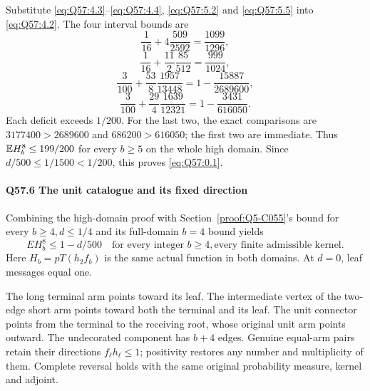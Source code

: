 Substitute \eqref{eq:Q57:4.3}--\eqref{eq:Q57:4.4},
\eqref{eq:Q57:5.2} and \eqref{eq:Q57:5.5} into
\eqref{eq:Q57:4.2}. The four interval bounds are
\[
\frac1{16}+4\frac{509}{2592}=\frac{1099}{1296},
\]
\[
\frac1{16}+\frac{11}{2}\frac{85}{512}=\frac{999}{1024},
\]
\[
\frac3{100}+\frac{53}{8}\frac{1957}{13448}
=1-\frac{15887}{2689600},
\]
\[
\frac3{100}+\frac{29}{4}\frac{1639}{12321}
=1-\frac{3431}{616050}.
\tag{Q57.5.6}\label{eq:Q57:5.6}
\]
Each deficit exceeds \(1/200\). For the last two, the exact comparisons are
\(3177400>\allowbreak 2689600\) and \(686200>\allowbreak 616050\); the first two are immediate.
Thus \(\mathbb E H_b^8\le\allowbreak 199/200\) for every \(b\ge\allowbreak 5\) on the whole high domain.
Since \(d/500\le\allowbreak 1/1500<\allowbreak 1/200\), this proves \eqref{eq:Q57:0.1}.

\paragraph{Q57.6 The unit catalogue and its fixed direction}
Combining the high-domain proof with Section~\ref{proof:Q5-C055}'s bound for every \(b\ge\allowbreak 4,\allowbreak d\le\allowbreak 1/4\) and its full-domain \(b=\allowbreak 4\) bound yields
\[
\boxed{EH_b^8\le1-d/500
\quad\text{for every integer }b\ge4,\text{every finite admissible kernel}.} \tag{Q57.6.1}\label{eq:Q57:6.1}
\]
Here \(H_b=\allowbreak pT(h_2f_b)\) is the same actual function in both domains.
At \(d=\allowbreak 0\), leaf messages equal one.

The long terminal arm points toward its leaf.
The intermediate vertex of the two-edge short arm points toward both the terminal and its leaf.
The unit connector points from the terminal to the receiving root, whose original unit arm points outward.
The undecorated component has \(b+4\) edges.
Genuine equal-arm pairs retain their directions \(f_\ell h_\ell\le\allowbreak 1\); positivity restores any number and multiplicity of them.
Complete reversal holds with the same original probability measure, kernel and adjoint.
